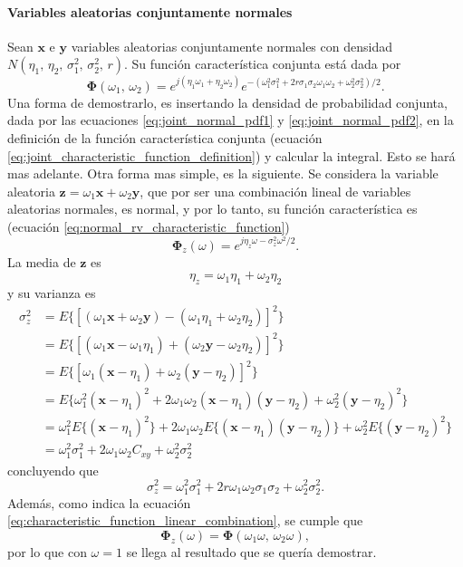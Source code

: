 \documentclass[a4paper]{report}
\newcommand{\x}{\mathbf{x}}
\newcommand{\y}{\mathbf{y}}
\newcommand{\z}{\mathbf{z}}
\newcommand{\Phibf}{\mathbf{\Phi}}
\begin{document}
\paragraph{Variables aleatorias conjuntamente normales}
Sean \(\x\) e \(\y\) variables aleatorias conjuntamente normales con densidad \(N(\eta_1,\,\eta_2,\,\sigma_1^2,\,\sigma_2^2,\,r)\). Su función característica conjunta está dada por
\begin{equation}\label{eq:characteristic_function_jointly_normal}
 \Phibf(\omega_1,\,\omega_2)=e^{j(\eta_1\omega_1+\eta_2\omega_2)}e^{-(\omega_1^2\sigma_1^2+2r\sigma_1\sigma_2\omega_1\omega_2+\omega_2^2\sigma_2^2)/2}.
\end{equation}
Una forma de demostrarlo, es insertando la densidad de probabilidad conjunta, dada por las ecuaciones \ref{eq:joint_normal_pdf1} y \ref{eq:joint_normal_pdf2}, en la definición de la función característica conjunta (ecuación \ref{eq:joint_characteristic_function_definition}) y calcular la integral. Esto se hará mas adelante. Otra forma mas simple, es la siguiente. Se considera la variable aleatoria \(\z=\omega_1\x+\omega_2\y\), que por ser una combinación lineal de variables aleatorias normales, es normal, y por lo tanto, su función característica es (ecuación \ref{eq:normal_rv_characteristic_function})
\[
 \Phibf_z(\omega)=e^{j\eta_z\omega-\sigma_z^2\omega^2/2}.
\]
La media de \(\z\) es
\[
 \eta_z=\omega_1\eta_1+\omega_2\eta_2
\]
y su varianza es
\begin{align*}
\sigma_z^2&=E\{\left[(\omega_1\x+\omega_2\y)-(\omega_1\eta_1+\omega_2\eta_2)\right]^2\}\\
  &=E\{\left[(\omega_1\x-\omega_1\eta_1)+(\omega_2\y-\omega_2\eta_2)\right]^2\}\\
  &=E\{\left[\omega_1(\x-\eta_1)+\omega_2(\y-\eta_2)\right]^2\}\\
  &=E\{\omega_1^2(\x-\eta_1)^2+2\omega_1\omega_2(\x-\eta_1)(\y-\eta_2)+\omega_2^2(\y-\eta_2)^2\}\\
  &=\omega_1^2E\{(\x-\eta_1)^2\}+2\omega_1\omega_2E\{(\x-\eta_1)(\y-\eta_2)\}+\omega_2^2E\{(\y-\eta_2)^2\}\\
  &=\omega_1^2\sigma_1^2+2\omega_1\omega_2C_{xy}+\omega_2^2\sigma_2^2
\end{align*}
concluyendo que
\[
 \sigma_z^2=\omega_1^2\sigma_1^2+2r\omega_1\omega_2\sigma_1\sigma_2+\omega_2^2\sigma_2^2.
\]
Además, como indica la ecuación \ref{eq:characteristic_function_linear_combination}, se cumple que
\[
 \Phibf_z(\omega)=\Phibf(\omega_1\omega,\,\omega_2\omega),
\]
por lo que con \(\omega=1\) se llega al resultado que se quería demostrar.
\end{document}
